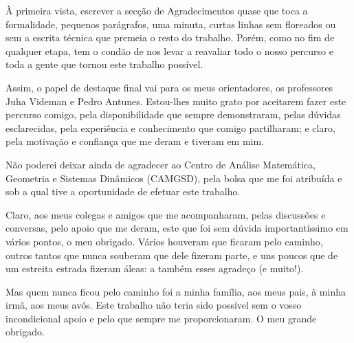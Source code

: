À primeira vista, escrever a secção de Agradecimentos quase que toca a formalidade, pequenos parágrafos, uma minuta, curtas linhas sem floreados ou sem a escrita técnica que premeia o resto do trabalho. Porém, como no fim de qualquer etapa, tem o condão de nos levar a reavaliar todo o nosso percurso e toda a gente que tornou este trabalho possível.

Assim, o papel de destaque final vai para os meus orientadores, os professores Juha Videman e Pedro Antunes. Estou-lhes muito grato por aceitarem fazer este percurso comigo, pela disponibilidade que sempre demonstraram, pelas dúvidas esclarecidas, pela experiência e conhecimento que comigo partilharam; e claro, pela motivação e confiança que me deram e tiveram em mim.

Não poderei deixar ainda de agradecer ao Centro de Análise Matemática, Geometria e Sistemas Dinâmicos (CAMGSD), pela bolsa que me foi atribuída e sob a qual tive a oportunidade de efetuar este trabalho.

Claro, aos meus colegas e amigos que me acompanharam, pelas discussões e conversas, pelo apoio que me deram, este que foi sem dúvida importantíssimo em vários pontos, o meu obrigado. Vários houveram que ficaram pelo caminho, outros tantos que nunca souberam que dele fizeram parte, e uns poucos que de um estreita estrada fizeram áleas: a também esses agradeço (e muito!).

Mas quem nunca ficou pelo caminho foi a minha família, aos meus pais, à minha irmã, aos meus avós. Este trabalho não teria sido possível sem o vosso incondicional apoio e pelo que sempre me proporcionaram. O meu grande obrigado.


